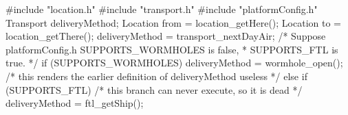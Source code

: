#include "location.h"
#include "transport.h"
#include "platformConfig.h"
Transport deliveryMethod;
Location from = location_getHere();
Location to = location_getThere();
deliveryMethod = transport_nextDayAir;
/* Suppose platformConfig.h SUPPORTS_WORMHOLES is false,
 * SUPPORTS_FTL is true. */
if (SUPPORTS_WORMHOLES) {
    deliveryMethod = wormhole_open();
    /* this renders the earlier definition of deliveryMethod useless */
} else if (SUPPORTS_FTL) {
    /* this branch can never execute, so it is dead */
    deliveryMethod = ftl_getShip();
}